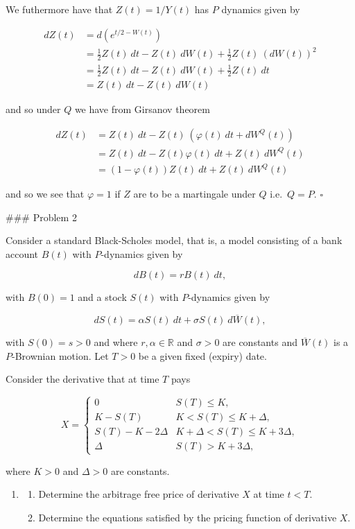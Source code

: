 \documentclass[
]{book}
\providecommand{\tightlist}{%
  \setlength{\itemsep}{0pt}\setlength{\parskip}{0pt}}
\begin{document}
We futhermore have that \(Z(t)=1/Y(t)\) has \(P\) dynamics given by

\begin{align*}
dZ(t)&=d(e^{t/2-W(t)})\\
&=\frac{1}{2}Z(t)\ dt-Z(t)\ dW(t)+\frac{1}{2}Z(t)\ (dW(t))^2\\
&=\frac{1}{2}Z(t)\ dt-Z(t)\ dW(t)+\frac{1}{2}Z(t)\ dt\\
&=Z(t)\ dt-Z(t)\ dW(t)
\end{align*}

and so under \(Q\) we have from Girsanov theorem

\begin{align*}
dZ(t)&=Z(t)\ dt-Z(t)\ (\varphi(t)\ dt+dW^Q(t))\\
&=Z(t)\ dt-Z(t)\varphi(t)\ dt+Z(t)\ dW^Q(t)\\
&=(1-\varphi(t))Z(t)\ dt+Z(t)\ dW^Q(t)
\end{align*}

and so we see that \(\varphi =1\) if \(Z\) are to be a martingale under \(Q\) i.e.~\(Q=P\). \(\square\)

\noindent\makebox[\linewidth]{\rule{\textwidth}{0.4pt}}
\#\#\# Problem 2

Consider a standard Black-Scholes model, that is, a model consisting of a bank account \(B(t)\) with \(P\)-dynamics given by

\[
dB(t)=rB(t)\ dt,
\]

with \(B(0)=1\) and a stock \(S(t)\) with \(P\)-dynamics given by

\[
dS(t)=\alpha S(t)\ dt+\sigma S(t)\ d\overline{W}(t),
\]

with \(S(0)=s>0\) and where \(r,\alpha\in\mathbb{R}\) and \(\sigma >0\) are constants and \(\overline{W}(t)\) is a \(P\)-Brownian motion. Let \(T>0\) be a given fixed (expiry) date.

Consider the derivative that at time \(T\) pays

\[
X=\begin{cases}
0 & S(T)\le K,\\
K-S(T) & K<S(T)\le K+\Delta,\\
S(T)-K-2\Delta & K+\Delta<S(T)\le K+3\Delta,\\
\Delta & S(T)> K+3\Delta,
\end{cases}
\]

where \(K>0\) and \(\Delta>0\) are constants.

\begin{enumerate}
\def\labelenumi{\alph{enumi}.}
\item
  \begin{enumerate}
  \def\labelenumii{\roman{enumii}.}
  \tightlist
  \item
    Determine the arbitrage free price of derivative \(X\) at time \(t<T\).
  \item
    Determine the equations satisfied by the pricing function of derivative \(X\).
  \end{enumerate}
\end{enumerate}
\end{document}
